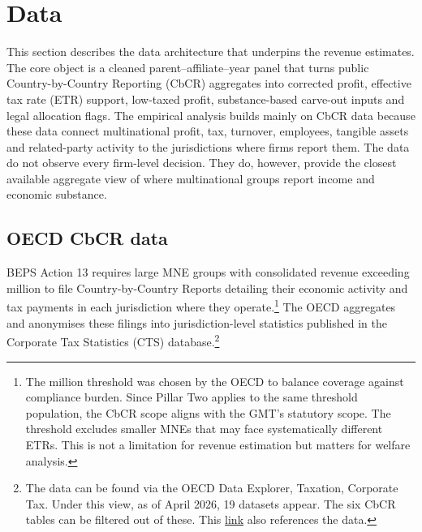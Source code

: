 \documentclass[11pt,a4paper]{article}
\newcommand{\EUR}{\texteuro}
\begin{document}
\newpage


\section{Data}\label{data}\label{sec:data}\label{sec:descriptive}

This section describes the data architecture that underpins the revenue estimates. The core object is a cleaned parent--affiliate--year panel that turns public Country-by-Country Reporting (CbCR) aggregates into corrected profit, effective tax rate (ETR) support, low-taxed profit, substance-based carve-out inputs and legal allocation flags. The empirical analysis builds mainly on CbCR data because these data connect multinational profit, tax, turnover, employees, tangible assets and related-party activity to the jurisdictions where firms report them. The data do not observe every firm-level decision. They do, however, provide the closest available aggregate view of where multinational groups report income and economic substance.

\subsection{OECD CbCR data}\label{CbCR}

BEPS Action 13 requires large MNE groups with consolidated revenue exceeding \EUR750 million to file Country-by-Country Reports detailing their economic activity and tax payments in each jurisdiction where they operate.\footnote{The \EUR750 million threshold was chosen by the OECD to balance coverage against compliance burden. Since Pillar Two applies to the same threshold population, the CbCR scope aligns with the GMT's statutory scope. The threshold excludes smaller MNEs that may face systematically different ETRs. This is not a limitation for revenue estimation but matters for welfare analysis.} The OECD aggregates and anonymises these filings into jurisdiction-level statistics published in the Corporate Tax Statistics (CTS) database.\footnote{The data can be found via the OECD Data Explorer, Taxation, Corporate Tax. Under this view, as of April 2026, 19 datasets appear. The six CbCR tables can be filtered out of these. This \href{https://data-explorer.oecd.org/?fs\%5B0\%5D=Topic\%2C1\%7CTaxation\%23TAX\%23\%7CCorporate\%20tax\%23TAX_CPT\%23&pg=0&fc=Topic&bp=true&snb=19}{link} also references the data.}
\end{document}
